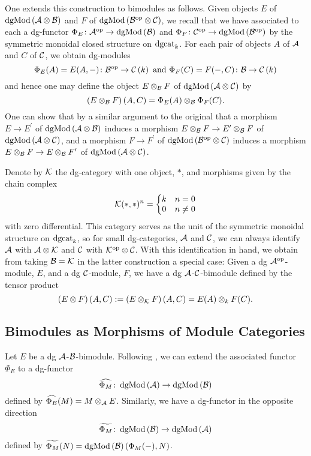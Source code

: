 \documentclass[dissertation.tex]{subfiles}
\begin{document}
One extends this construction to bimodules as follows.
Given objects \(E\) of \(\operatorname{dgMod}\left(\mathcal{A} \otimes \mathcal{B}\right)\) and \(F\) of \(\operatorname{dgMod}\left(\mathcal{B}^{{\operatorname{op}}} \otimes \mathcal{C}\right)\), we recall that we have associated to each a dg-functor \(\Phi_E \colon \mathcal{A}^{{\operatorname{op}}} \rightarrow \operatorname{dgMod}\left(\mathcal{B}\right)\) and \(\Phi_F \colon \mathcal{C}^{{\operatorname{op}}} \rightarrow \operatorname{dgMod}\left(\mathcal{B}^{{\operatorname{op}}}\right)\) by the symmetric monoidal closed structure on \(\operatorname{dgcat}_k\).
For each pair of objects \(A\) of \(\mathcal{A}\) and \(C\) of \(\mathcal{C}\), we obtain dg-modules
\[\Phi_E(A) = E(A, -) \colon \B^{\opp} \ra \CH{k}\ \text{and}\ \Phi_F(C) = F( -, C) \colon \B \ra \CH{k}\]
and hence one may define the object \(E \otimes_{\mathcal{B}} F\) of \(\operatorname{dgMod}\left(\mathcal{A} \otimes \mathcal{C}\right)\) by
\[\left(E \otimes_{\mathcal{B}} F\right)(A, C) = \Phi_E(A) \otimes_{\mathcal{B}} \Phi_F(C).\]
One can show that by a similar argument to the original that a morphism \(E \to E^\prime\) of \(\operatorname{dgMod}\left(\mathcal{A} \otimes \mathcal{B}\right)\) induces a morphism \(E \otimes_{\mathcal{B}} F \to E^\prime \otimes_{\mathcal{B}} F\) of \(\operatorname{dgMod}\left(\mathcal{A} \otimes \mathcal{C}\right)\), and a morphism \(F \to F^\prime\) of \(\operatorname{dgMod}\left(\mathcal{B}^{{\operatorname{op}}} \otimes \mathcal{C}\right)\) induces a morphism \(E \otimes_{\mathcal{B}} F \to E \otimes_{\mathcal{B}} F^\prime\) of \(\operatorname{dgMod}\left(\mathcal{A} \otimes \mathcal{C}\right)\).

\begin{remark}\label{rem: tensor over k}
  Denote by \(\mathcal{K}\) the dg-category with one object, \(\ast\), and morphisms given by the chain complex
  \[\mathcal{K}(\ast,\ast)^n =
  \left\{ \begin{matrix}
    k & n = 0\\
    0 & n \neq 0
  \end{matrix}\right.\]  with zero differential.
  This category serves as the unit of the symmetric monoidal structure on \(\operatorname{dgcat}_k\), so for small dg-categories, \(\mathcal{A}\) and \(\mathcal{C}\), we can always identify \(\mathcal{A}\) with \(\mathcal{A} \otimes \mathcal{K}\) and \(\mathcal{C}\) with \(\mathcal{K}^{\operatorname{op}} \otimes \mathcal{C}\).
  With this identification in hand, we obtain from taking \(\mathcal{B} = \mathcal{K}\) in the latter construction a special case:
  Given a dg \(\mathcal{A}^{\operatorname{op}}\)-module, \(E\), and a dg \(\mathcal{C}\)-module, \(F\), we have a dg \(\mathcal{A}\)-\(\mathcal{C}\)-bimodule defined by the tensor product
  \[\left(E \otimes F\right)(A,C) := \left(E \otimes_{\mathcal{K}} F\right)(A,C) = E(A) \otimes_k F(C).\]
\end{remark}

\subsection{Bimodules as Morphisms of Module Categories}
Let \(E\) be a dg \(\mathcal{A}\)-\(\mathcal{B}\)-bimodule.
Following \cite[Section 3]{CS}, we can extend the associated functor \(\Phi_E\) to a dg-functor
\[\widehat{\Phi_M} \colon \operatorname{dgMod}\left(\mathcal{A}\right) \to \operatorname{dgMod}\left(\mathcal{B}\right)\]
defined by \(\widehat{\Phi_E}(M) = M \otimes_{\mathcal{A}} E\).
Similarly, we have a dg-functor in the opposite direction
\[\widetilde{\Phi_M} \colon \operatorname{dgMod}\left(\mathcal{B}\right) \to \operatorname{dgMod}\left(\mathcal{A}\right)\]
defined by \(\widetilde{\Phi_M}(N) = \operatorname{dgMod}\left(\mathcal{B}\right)(\Phi_M( - ), N)\).
\end{document}
